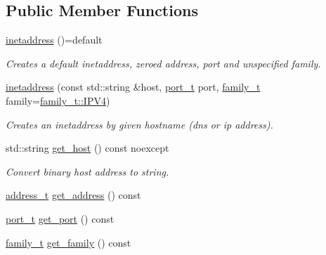 \subsection*{Public Member Functions}
\begin{DoxyCompactItemize}
\item 
\hyperlink{structdevfix_1_1net_1_1inetaddress_a823bec9f0bc7437854ec9270c610756a}{inetaddress} ()=default
\begin{DoxyCompactList}\small\item\em Creates a default {\itshape inetaddress}, zeroed address, port and unspecified family. \end{DoxyCompactList}\item 
\hyperlink{structdevfix_1_1net_1_1inetaddress_a2b5fb7c7cb63230d6188c74d90e323dc}{inetaddress} (const std\+::string \&host, \hyperlink{structdevfix_1_1net_1_1inetaddress_a3eaadc730f2b4625987cf948ea485410}{port\+\_\+t} port, \hyperlink{structdevfix_1_1net_1_1inetaddress_a1c470962b4c9c675d475dba2344b50f4}{family\+\_\+t} family=\hyperlink{structdevfix_1_1net_1_1inetaddress_a1c470962b4c9c675d475dba2344b50f4ae638ca944d27f97f46a5986a5aa53434}{family\+\_\+t\+::\+I\+P\+V4})
\begin{DoxyCompactList}\small\item\em Creates an {\itshape inetaddress} by given hostname (dns or ip address). \end{DoxyCompactList}\item 
std\+::string \hyperlink{structdevfix_1_1net_1_1inetaddress_a4524692fae7a767e38600012c6f8f3cf}{get\+\_\+host} () const noexcept
\begin{DoxyCompactList}\small\item\em Convert binary host address to string. \end{DoxyCompactList}\item 
\hyperlink{structdevfix_1_1net_1_1inetaddress_a2eb252de4b894131be8fcda68118bd77}{address\+\_\+t} \hyperlink{structdevfix_1_1net_1_1inetaddress_a8c606f2398a2d3c9436c4932d6c590b2}{get\+\_\+address} () const
\item 
\hyperlink{structdevfix_1_1net_1_1inetaddress_a3eaadc730f2b4625987cf948ea485410}{port\+\_\+t} \hyperlink{structdevfix_1_1net_1_1inetaddress_ad2c4af8ffc473aebc58bc1bbe0277e7d}{get\+\_\+port} () const
\item 
\hyperlink{structdevfix_1_1net_1_1inetaddress_a1c470962b4c9c675d475dba2344b50f4}{family\+\_\+t} \hyperlink{structdevfix_1_1net_1_1inetaddress_a254e4950de6c6443a39196c6c7f58db4}{get\+\_\+family} () const
\end{DoxyCompactItemize}


